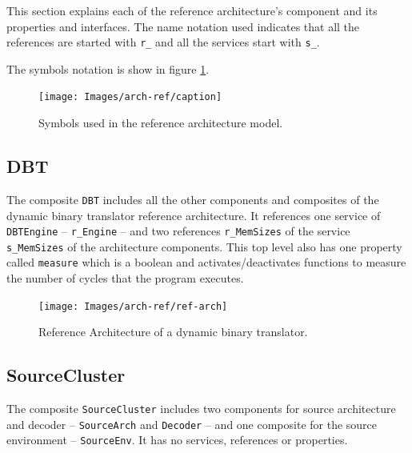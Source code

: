 \documentclass{report}
\begin{document}
	\par This section explains each of the reference architecture's component and its properties and interfaces. The name notation used indicates that all the references are started with \texttt{r\_} and all the services start with \texttt{s\_}.
	\par The symbols notation is show in figure \ref{fig:caption}.
	
	\begin{figure} [H]
		\centering
		\texttt{[image: Images/arch-ref/caption]}
		\caption{Symbols used in the reference architecture model.}
		\label{fig:caption}
	\end{figure}

	
		\subsection{DBT}
		
		\par The composite \texttt{DBT} includes all the other components and composites of the dynamic binary translator reference architecture. It references one service of \texttt{DBTEngine} -- \texttt{r\_Engine} -- and two references \texttt{r\_MemSizes} of the service \texttt{s\_MemSizes} of the architecture components. This top level also has one property called \texttt{measure} which is a boolean and activates/deactivates functions to measure the number of cycles that the program executes.
		
		\begin{figure} [H]
			\centering
			\texttt{[image: Images/arch-ref/ref-arch]}
			\caption{Reference Architecture of a dynamic binary translator.}
			\label{fig:ref-arch}
		\end{figure}	
	
		\subsection{SourceCluster}
		
		\par The composite \texttt{SourceCluster} includes two components for source architecture and decoder -- \texttt{SourceArch} and \texttt{Decoder} -- and one composite for the source environment -- \texttt{SourceEnv}. It has no services, references or properties.
		
\end{document}
